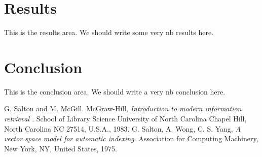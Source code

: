\documentclass[lettersize,journal,12pt]{IEEEtran}
\begin{document}
\section{Results}

This is the results area. We should write some very nb results here.

\section{Conclusion}

This is the conclusion area. We should write a very nb conclusion here.



\begin{thebibliography}{1}

	G. Salton and M. McGill. McGraw-Hill, {\it{Introduction to modern information retrieval }}. School of Library Science University of North Carolina Chapel Hill, North Carolina NC 27514, U.S.A., 1983. 
    G. Salton, A. Wong, C. S. Yang, {\it{A vector space model for automatic indexing}}. Association for Computing Machinery, New York, NY, United States, 1975.


\end{thebibliography}
\end{document}
